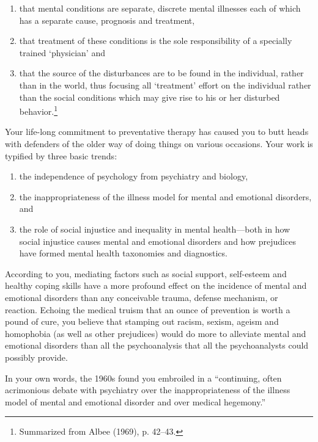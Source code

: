 \begin{refsection}
\begin{enumerate}
\item that mental conditions are separate, discrete mental illnesses each of which has a separate cause, prognosis and treatment, 

\item that treatment of these conditions is the sole responsibility of a specially trained ‘physician’ and 

\item that the source of the disturbances are to be found in the individual, rather than in the world, thus focusing all ‘treatment’ effort on the individual rather than the social conditions which may give rise to his or her disturbed behavior.\footnote{Summarized from Albee (1969), p. 42--43.}

\end{enumerate}

Your life-long commitment to preventative therapy has caused you to butt heads with defenders of the older way of doing things on various occasions. Your work is typified by three basic trends: 

\begin{enumerate}
\item the independence of psychology from psychiatry and biology, 

\item the inappropriateness of the illness model for mental and emotional disorders, and 

\item the role of social injustice and inequality in mental health—both in how social injustice causes mental and emotional disorders and how prejudices have formed mental health taxonomies and diagnostics.

\end{enumerate}

According to you, mediating factors such as social support, self-esteem and healthy coping skills have a more profound effect on the incidence of mental and emotional disorders than any conceivable trauma, defense mechanism, or reaction. Echoing the medical truism that an ounce of prevention is worth a pound of cure, you believe that stamping out racism, sexism, ageism and homophobia (as well as other prejudices) would do more to alleviate mental and emotional disorders than all the psychoanalysis that all the psychoanalysts could possibly provide.

In your own words, the 1960s found you embroiled in a “continuing, often acrimonious debate with psychiatry over the inappropriateness of the illness model of mental and emotional disorder and over medical hegemony.”


\end{refsection}
